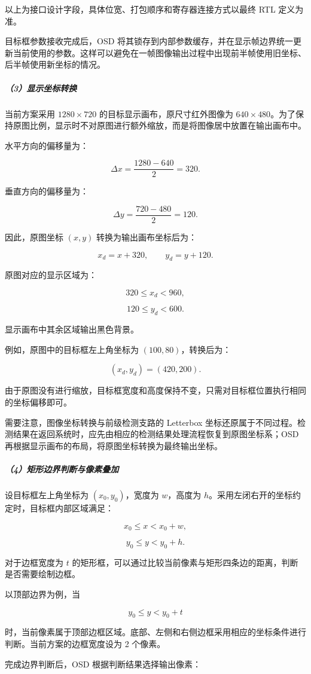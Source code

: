 \documentclass[UTF8,a4paper,12pt,fontset=windows]{ctexart}
\begin{document}
以上为接口设计字段，具体位宽、打包顺序和寄存器连接方式以最终 RTL 定义为准。

目标框参数接收完成后，OSD 将其锁存到内部参数缓存，并在显示帧边界统一更新当前使用的参数。这样可以避免在一帧图像输出过程中出现前半帧使用旧坐标、后半帧使用新坐标的情况。

\subparagraph*{（3）显示坐标转换}
当前方案采用 \(1280\times720\) 的目标显示画布，原尺寸红外图像为 \(640\times480\)。为了保持原图比例，显示时不对原图进行额外缩放，而是将图像居中放置在输出画布中。

水平方向的偏移量为：

\[
\Delta x=\frac{1280-640}{2}=320.
\]

垂直方向的偏移量为：

\[
\Delta y=\frac{720-480}{2}=120.
\]

因此，原图坐标 \((x,y)\) 转换为输出画布坐标后为：

\[
x_d=x+320,\qquad y_d=y+120.
\]

原图对应的显示区域为：

\[
320\leq x_d<960,
\]

\[
120\leq y_d<600.
\]

显示画布中其余区域输出黑色背景。

例如，原图中的目标框左上角坐标为 \((100,80)\)，转换后为：

\[
(x_d,y_d)=(420,200).
\]

由于原图没有进行缩放，目标框宽度和高度保持不变，只需对目标框位置执行相同的坐标偏移即可。

需要注意，图像坐标转换与前级检测支路的 Letterbox 坐标还原属于不同过程。检测结果在返回系统时，应先由相应的检测结果处理流程恢复到原图坐标系；OSD 再根据显示画布的布局，将原图坐标转换为最终输出坐标。

\subparagraph*{（4）矩形边界判断与像素叠加}
设目标框左上角坐标为 \((x_0,y_0)\)，宽度为 \(w\)，高度为 \(h\)。采用左闭右开的坐标约定时，目标框内部区域满足：

\[
x_0\leq x<x_0+w,
\]

\[
y_0\leq y<y_0+h.
\]

对于边框宽度为 \(t\) 的矩形框，可以通过比较当前像素与矩形四条边的距离，判断是否需要绘制边框。

以顶部边界为例，当

\[
y_0\leq y<y_0+t
\]

时，当前像素属于顶部边框区域。底部、左侧和右侧边框采用相应的坐标条件进行判断。当前方案的边框宽度设为 2 个像素。

完成边界判断后，OSD 根据判断结果选择输出像素：
\end{document}

